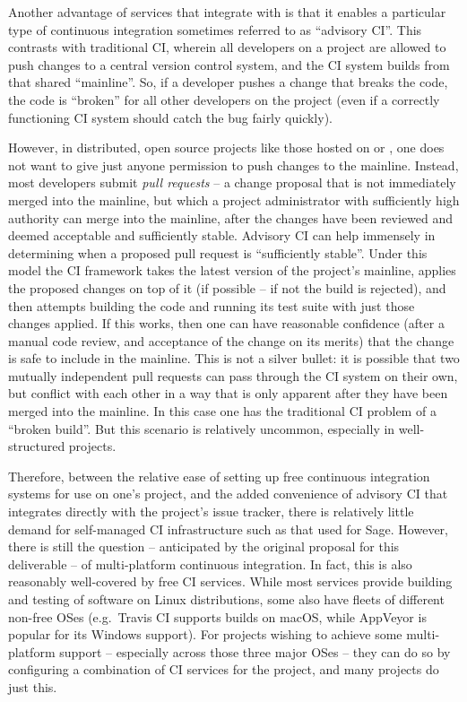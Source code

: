 \documentclass{deliverablereport}
\begin{document}
Another advantage of services that integrate with \GitHub is that it enables a
particular type of continuous integration sometimes referred to as ``advisory
CI''.  This contrasts with traditional CI, wherein all developers on a project
are allowed to push changes to a central version control system, and the CI
system builds from that shared ``mainline''.  So, if a developer
pushes a change that breaks the code, the code is ``broken''
for all other developers on the project (even if a correctly functioning CI
system should catch the bug fairly quickly).

However, in distributed, open source projects like those hosted on \GitHub or
\GitLab, one does not want to give just anyone permission to push changes to
the mainline.  Instead, most developers submit {\em pull requests} -- a change
proposal that is not immediately merged into the mainline, but which a project
administrator with sufficiently high authority can merge
into the mainline, after the changes have been reviewed and deemed
acceptable and sufficiently stable.  Advisory CI can help immensely in
determining when a proposed pull request is ``sufficiently stable''.  Under
this model the CI framework takes the latest version of the project's mainline,
applies the proposed changes on top of it (if possible -- if not the build is
rejected), and then attempts building the code and running its test suite with
just those changes applied.  If this works, then one can have reasonable
confidence (after a manual code review, and acceptance of the change on its
merits) that the change is safe to include in the mainline.  This is not a
silver bullet: it is possible that two mutually independent pull requests can
pass through the CI system on their own, but conflict with each other in a way
that is only apparent after they have been merged into the mainline.  In this
case one has the traditional CI problem of a ``broken build''.  But this
scenario is relatively uncommon, especially in well-structured projects.

Therefore, between the relative ease of setting up free continuous integration
systems for use on one's project, and the added convenience of advisory CI that
integrates directly with the project's issue tracker, there is relatively
little demand for self-managed CI infrastructure such as that used for Sage.
However, there is still the question -- anticipated by the original proposal
for this deliverable -- of multi-platform continuous integration.  In fact,
this is also reasonably well-covered by free CI services.  While most services
provide building and testing of software on Linux distributions, some also have
fleets of different non-free OSes (e.g.~Travis CI supports builds on macOS,
while AppVeyor is popular for its Windows support).  For projects wishing to
achieve some multi-platform support -- especially across those three major OSes
-- they can do so by configuring a combination of CI services for the project,
and many projects do just this.
\end{document}
